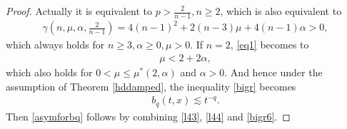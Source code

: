 \documentclass[10pt,a4paper]{amsart}
\begin{document}
\begin{proof}
Actually it is equivalent to $p>\frac 2{n-1}, n\ge 2$, which is also equivalent to
\begin{equation}\label{eq1}
\begin{aligned}
\gamma\left(n, \mu, \alpha, \frac 2{n-1}\right)=4(n-1)^2+2(n-3)\mu+4(n-1)\alpha
>0,
\end{aligned}
\end{equation}
which always holds for $n\ge 3, \alpha\ge 0, \mu>0$. If $n=2$, \eqref{eq1} becomes to
\begin{equation}\label{eq2}
\begin{aligned}
\mu<2+2\alpha,
\end{aligned}
\end{equation}
which also holds for $0<\mu\le \mu^*(2, \alpha)$ and $\alpha>0$. And hence under the assumption of Theorem \ref{hddamped}, the inequality \eqref{bigr} becomes
\begin{equation}\label{bigr6}
\begin{aligned}
b_q(t, x)\lesssim t^{-q}.
\end{aligned}
\end{equation}
Then \eqref{asymforbq} follows by combining \eqref{l43}, \eqref{l44} and \eqref{bigr6}.


\end{proof}
\end{document}
